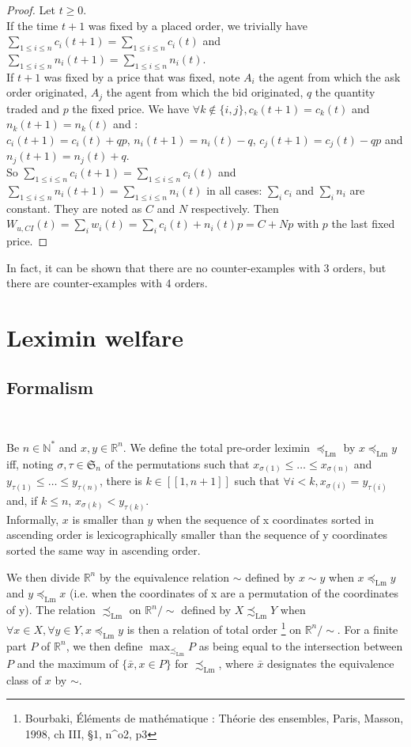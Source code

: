 \documentclass[a4paper]{article}
\newcommand{\N}{\mathbb{N}}
\newcommand{\R}{\mathbb{R}}
\newcommand{\Sg}{\mathfrak{S}}
\newcommand{\Lm}{\preceq_\mathrm{Lm}} %
\newcommand{\Lms}{\precsim_\mathrm{Lm}}
\newtheorem[style=S, bodystyle=\noindent]{thm}{Theorem}[section]
\newtheorem[style=S, bodystyle=\noindent]{defn}[thm]{Definition}
\newtheorem[style=S, bodystyle=\noindent]{propo}[thm]{Proposition}
\newtheorem[style=S, bodystyle=\noindent]{prop}[thm]{Property}
\newtheorem[style=S, bodystyle=\noindent]{coro}[thm]{Corollary}
\newtheorem[style=S, bodystyle=\noindent]{lem}[thm]{Lemma}
\newtheorem[style=S, headstyle=\bfseries\boldmath Theorem, bodystyle=\noindent]{thm*}{Theorem}
\newtheorem[style=S, headstyle=\bfseries\boldmath Definition, bodystyle=\noindent]{defn*}{Definition}
\newtheorem[style=S, headstyle=\bfseries\boldmath Proposition, bodystyle=\noindent]{propo*}{Proposition}
\newtheorem[style=S, headstyle=\bfseries\boldmath Property, bodystyle=\noindent]{prop*}{Property}
\newtheorem[style=S, headstyle=\bfseries\boldmath Corollary, bodystyle=\noindent]{coro*}{Corollary}
\newtheorem[style=S, headstyle=\bfseries\boldmath Lemma, bodystyle=\noindent]{lem*}{Lemma}
\begin{document}
\begin{proof}
	Let $t \geq 0$.\\
	If the time $t+1$ was fixed by a placed order, we trivially have $\sum_{1\leq i\leq n}c_i(t+1) = \sum_{1\leq i\leq n}c_i(t)$ and $\sum_{1\leq i\leq n}n_i(t+1) = \sum_{1\leq i\leq n}n_i(t)$. \\
	If $t+1$ was fixed by a price that was fixed, note $A_i$ the agent from which the ask order originated, $A_j$ the agent from which the bid originated, $q$ the quantity traded and $p$ the fixed price. We have $\forall k \not\in \{i,j\}, c_k(t+1) = c_k(t)$ and $n_k(t+1) = n_k(t)$ and : \\
	$c_i(t+1) = c_i(t) + qp$, $n_i(t+1) = n_i(t) - q$, $c_j(t+1) = c_j(t) - qp$ and $n_j(t+1) = n_j(t) + q$. \\
	So $\sum_{1\leq i\leq n}c_i(t+1) = \sum_{1\leq i\leq n}c_i(t)$ and $\sum_{1\leq i\leq n}n_i(t+1) = \sum_{1\leq i\leq n}n_i(t)$ in all cases: $\sum_ic_i$ and $\sum_in_i$ are constant. They are noted as $C$ and $N$ respectively.
	Then $W_{u,CI}(t) = \sum_iw_i(t) = \sum_i c_i(t) + n_i(t)p = C + Np$ with $p$ the last fixed price.
\end{proof}

In fact, it can be shown that there are no counter-examples with 3 orders, but there are counter-examples with 4 orders.
\section{Leximin welfare}

\subsection{Formalism}
~
\begin{defn}
    Be $n\in\N^*$ and $x,y \in \R^n$. We define the total pre-order leximin $\Lm$ by $x \Lm y$ iff, noting $\sigma, \tau \in \Sg_n$ of the permutations such that $x_{\sigma(1)} \leq \ldots \leq x_{\sigma(n)}$ and $y_{\tau(1)} \leq \ldots \leq y_{\tau(n)}$, there is $k \in [\![1,n+1]\!]$ such that $\forall i < k, x_{\sigma(i)} = y_{\tau(i)}$ and, if $k \leq n$, $x_{\sigma(k)} < y_{\tau(k)}$. \\
	Informally, $x$ is smaller than $y$ when the sequence of x coordinates sorted in ascending order is lexicographically smaller than the sequence of y coordinates sorted the same way in ascending order.
\end{defn}

\par
We then divide $\R^n$ by the equivalence relation $\sim$ defined by $x\sim y$ when $x \Lm y$ and $y \Lm x$ (i.e. when the coordinates of x are a permutation of the coordinates of y). The relation $\Lms$ on $\R^n/\sim$ defined by $X\Lms Y$ when $\forall x \in X,\forall y \in Y, x\Lm y$ is then a relation of total order \footnote{Bourbaki, \'Eléments de mathématique : Théorie des ensembles, Paris, Masson, 1998, ch III, \S 1, n^{o}2, p3} on $\R^n/\sim$. For a finite part $P$ of $\R^n$, we then define $\max_{\Lms}P$ as being equal to the intersection between $P$ and the maximum of $\{\bar x, x \in P\}$ for $\Lms$, where $\bar x$ designates the equivalence class of $x$ by $\sim$.
\end{document}
